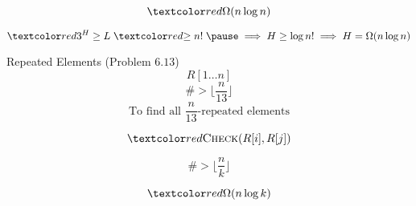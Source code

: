 \begin{frame}{}

  \[
    \red{\Omega(n \log n)}
  \]

  \pause
  \[
    \red{3^{H}} \ge L \;\red{\ge n!}\; \pause \implies H \ge \log n! \implies H = \Omega(n \log n)
  \]
\end{frame}

\begin{frame}{}
  \begin{exampleblock}{Repeated Elements (Problem $6.13$)}
    \[
      R[1 \dots n]
    \]
    \[
      \# > \lfloor \frac{n}{13} \rfloor
    \]
    \[
      \text{To find all $\frac{n}{13}$-repeated elements}
    \]

    \[
      \red{\textsc{Check}(R[i], R[j])}
    \]
  \end{exampleblock}
\end{frame}

\begin{frame}{}
  \[
	\# > \lfloor \frac{n}{k} \rfloor
  \]

  \pause
  \[
    \red{\Omega(n \log k)}
  \]

  \pause

\end{frame}
